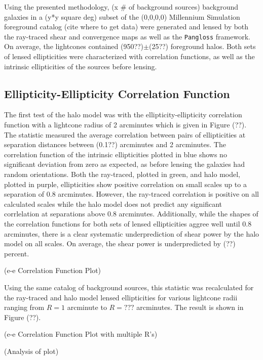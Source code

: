 \documentclass[%
 reprint,
 amsmath,amssymb,
 aps,
]{revtex4-1}
\begin{document}
Using the presented methodology, (x \# of background sources) background galaxies in a (y*y square deg) subset of the (0,0,0,0) Millennium Simulation foreground catalog (cite where to get data) were generated and lensed by both the ray-traced shear and convergence maps as well as the \texttt{Pangloss} framework. On average, the lightcones contained (950??)$\pm$(25??) foreground halos. Both sets of lensed ellipticities were characterized with correlation functions, as well as the intrinsic ellipticities of the sources before lensing.

\subsection*{Ellipticity-Ellipticity Correlation Function}

The first test of the halo model was with the ellipticity-ellipticity correlation function with a lightcone radius of 2 arcminutes which is given in Figure (??). The statistic measured the average correlation between pairs of ellipticities at separation distances between (0.1??) arcminutes and 2 arcminutes. The correlation function of the intrinsic ellipticities plotted in blue shows no significant deviation from zero as expected, as before lensing the galaxies had random orientations. Both the ray-traced, plotted in green, and halo model, plotted in purple, ellipticities show positive correlation on small scales up to a separation of 0.8 arcminutes. However, the ray-traced correlation is positive on all calculated scales while the halo model does not predict any significant corrlelation at separations above 0.8 arcminutes. Additionally, while the shapes of the correlation functions for both sets of lensed ellipticities aggree well until 0.8 arcminutes, there is a clear systematic underprediction of shear power by the halo model on all scales. On average, the shear power is underpredicted by (??) percent.

(e-e Correlation Function Plot)

Using the same catalog of background sources, this statistic was recalculated for the ray-traced and halo model lensed ellipticities for various lightcone radii ranging from $R=1$ arcminute to $R=???$ arcminutes. The result is shown in Figure (??).

(e-e Correlation Function Plot with multiple R's)

(Analysis of plot)
\end{document}

